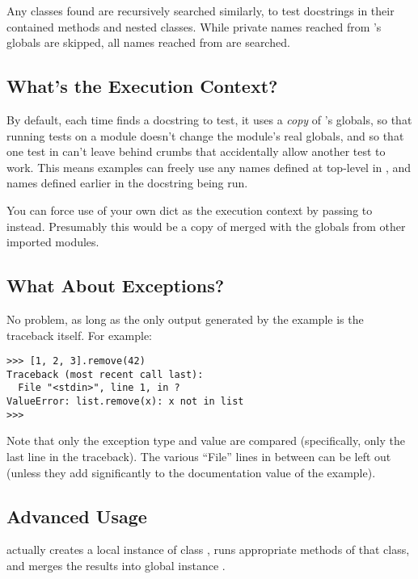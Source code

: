 Any classes found are recursively searched similarly, to test docstrings in
their contained methods and nested classes.  While private names reached
from 's globals are skipped, all names reached from
 are searched.

\subsection{What's the Execution Context?}

By default, each time  finds a docstring to test, it uses
a \emph{copy} of 's globals, so that running tests on a module
doesn't change the module's real globals, and so that one test in
 can't leave behind crumbs that accidentally allow another test
to work.  This means examples can freely use any names defined at top-level
in , and names defined earlier in the docstring being run.

You can force use of your own dict as the execution context by passing
 to  instead.  Presumably this
would be a copy of  merged with the globals from other
imported modules.

\subsection{What About Exceptions?}

No problem, as long as the only output generated by the example is the
traceback itself.  For example:

\begin{verbatim}
>>> [1, 2, 3].remove(42)
Traceback (most recent call last):
  File "<stdin>", line 1, in ?
ValueError: list.remove(x): x not in list
>>>
\end{verbatim}

Note that only the exception type and value are compared (specifically,
only the last line in the traceback).  The various ``File'' lines in
between can be left out (unless they add significantly to the documentation
value of the example).

\subsection{Advanced Usage}

 actually creates a local instance of class
, runs appropriate methods of that class, and merges
the results into global  instance .

